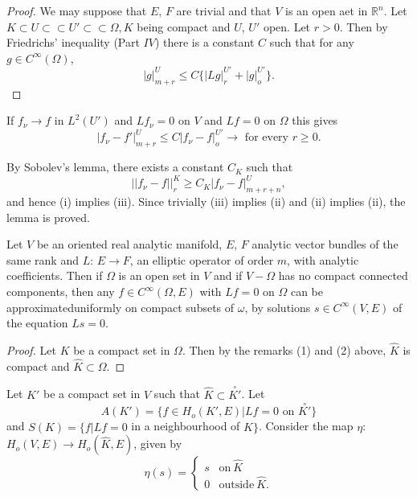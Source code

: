 \begin{proof}
  We may suppose that $E$, $F$ are trivial and that $V$ is an open aet
  in $\mathbb{R}^n$. Let $K \subset U \subset \subset U' \subset
  \subset \Omega, K$ being compact and $U$, $U'$ open. Let $r>
  0$. Then by Friedrichs' inequality (Part $IV$) there is a constant
  $C$ such that for any $g \in C^{\infty} (\Omega)$, 
  $$
  |g|^{U}_{m+r} \leq C\{ |Lg|^{U'}_r + |g|_o ^{U'}\}.
  $$
\end{proof}

If $f_{\nu} \to f$ in $L^2 (U')$ and $Lf_{\nu} = 0$ on $V$ and $Lf =
0$ on $\Omega$ this gives 
$$
|f_{\nu} - f'|^{U}_{m+r} \leq C |f_{\nu} - f|_o ^{U'} \to \text{ for
  every } r \geq 0. 
$$

By Sobolev's lemma, there exists a constant $C_K$ such that
$$
|| f_{\nu} - f || _r^K \geq C_K |f_{\nu} - f| ^{U}_{m+r+n},
$$
and hence (i) implies (iii). Since trivially (iii) implies (ii) and
(ii) implies (ii), the lemma is proved. 

\setcounter{theorem}{0}
\begin{theorem}\label{chap3:sec10:thm1}%
  Let $V$ be an oriented real analytic manifold, $E$, $F$ analytic
  vector bundles of the same rank and $L$: $E \to F$, an elliptic
  operator of order $m$, with analytic coefficients. Then if $\Omega$
  is an open set in $V$ and if $V - \Omega$ has no compact connected
  components, then any $f \in C^{\infty} (\Omega , E)$ with $Lf =0$ on
  $\Omega$ can be approximated\pageoriginale uniformly on compact subsets of
  $\omega$, by solutions $s \in C^{\infty} (V,E)$ of the equation $Ls
  = 0$. 
\end{theorem}

\begin{proof}
  Let $K$ be a compact set in $\Omega$. Then by the remarks (1) and
  (2) above, $\hat{K}$ is compact and $\hat{K} \subset \Omega$. 
\end{proof}

Let $K'$ be a compact set in $V$ such that $\hat{K} \subset
\overset{\circ}{K'}$. Let
$$
A(K') = \{ f \in H_o (K', E) | Lf = 0 \text{ on } \overset{\circ}{K'} \}
$$
and $S(K) = \{ f | Lf = 0$ in a neighbourhood of  $\hat{K}
\}$. Consider the map $\eta$: $H_o (V, E) \to H_o (\hat{K}, E)$, given
by 
$$
\eta (s) = 
\begin{cases} 
  s & \text{on}~ \hat{K} \\ 
  0 & \text{outside}~ \hat{K}. 
\end{cases}
$$ 

